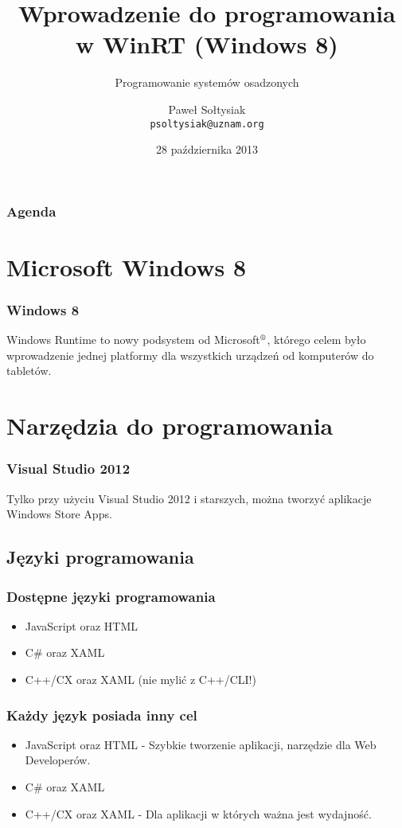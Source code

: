 \documentclass{beamer}
\title{Wprowadzenie do programowania w WinRT (Windows 8)}
\subtitle{Programowanie systemów osadzonych}
\author[Paweł Sołtysiak]
       {Paweł Sołtysiak \\ \texttt{psoltysiak@uznam.org}}
\institute{Wydział Informatyki\\ Zachodniopomorski Uniwersytet Technologiczny w Szczecinie}
\date{28 października 2013}
\begin{document}
\begin{frame}
\titlepage
\end{frame} 


\begin{frame}
\frametitle{Agenda} 
\tableofcontents
\end{frame} 

\section{Microsoft Windows 8}
\begin{frame}
\frametitle{Windows 8} 
Windows Runtime to nowy podsystem od Microsoft$\textsuperscript{\textregistered}$, którego celem było wprowadzenie jednej platformy dla wszystkich urządzeń od komputerów do tabletów.
\end{frame}

\section{Narzędzia do programowania}
\begin{frame}
\frametitle{Visual Studio 2012} 
Tylko przy użyciu Visual Studio 2012 i starszych, można tworzyć aplikacje Windows Store Apps.
\end{frame}

\subsection{Języki programowania}
\begin{frame}
\frametitle{Dostępne języki programowania} 
\begin{itemize}
\item JavaScript oraz HTML
\item C\# oraz XAML
\item C++/CX oraz XAML (nie mylić z C++/CLI!)
\end{itemize} 
\end{frame}

\begin{frame}
\frametitle{Każdy język posiada inny cel} 
\begin{itemize}
\item JavaScript oraz HTML - Szybkie tworzenie aplikacji, narzędzie dla Web Developerów.
\item C\# oraz XAML
\item C++/CX oraz XAML - Dla aplikacji w których ważna jest wydajność.
\end{itemize} 
\end{frame}
\end{document}
